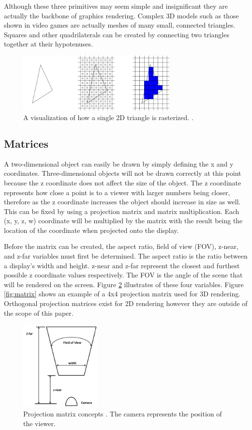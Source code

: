 \documentclass{article}
\begin{document}
Although these three primitives may seem simple and insignificant they are actually the backbone of graphics rendering. Complex 3D models such as those shown in video games are actually meshes of many small, connected triangles. Squares and other quadrilaterals can be created by connecting two triangles together at their hypotenuses.

\begin{figure}[h]
	\centering
	\includegraphics[height=3cm]{triangle-rendering}
	\caption{A visualization of how a single 2D triangle is rasterized. \cite{mckesson2018}.}
	\label{fig:triangle-rendering}
\end{figure}

\subsection{Matrices}
A two-dimensional object can easily be drawn by simply defining the x and y coordinates. Three-dimensional objects will not be drawn correctly at this point because the z coordinate does not affect the size of the object. The z coordinate represents how close a point is to a viewer with larger numbers being closer, therefore as the z coordinate increases the object should increase in size as well. This can be fixed by using a projection matrix and matrix multiplication. Each (x, y, z, w) coordinate will be multiplied by the matrix with the result being the location of the coordinate when projected onto the display.

Before the matrix can be created, the aspect ratio, field of view (FOV), z-near, and z-far variables must first be determined. The aspect ratio is the ratio between a display's width and height. z-near and z-far represent the closest and furthest possible z coordinate values respectively. The FOV is the angle of the scene that will be rendered on the screen. Figure \ref{fig:projection} illustrates of these four variables. Figure \ref{fig:matrix} shows an example of a 4x4 projection matrix used for 3D rendering. Orthogonal projection matrices exist for 2D rendering however they are outside of the scope of this paper.

\begin{figure}[h]
	\centering
	\includegraphics[height=4.5cm]{projection-matrix}
	\caption{Projection matrix concepts \cite{hernandez2019}. The camera represents the position of the viewer.}
	\label{fig:projection}
\end{figure}
\end{document}
